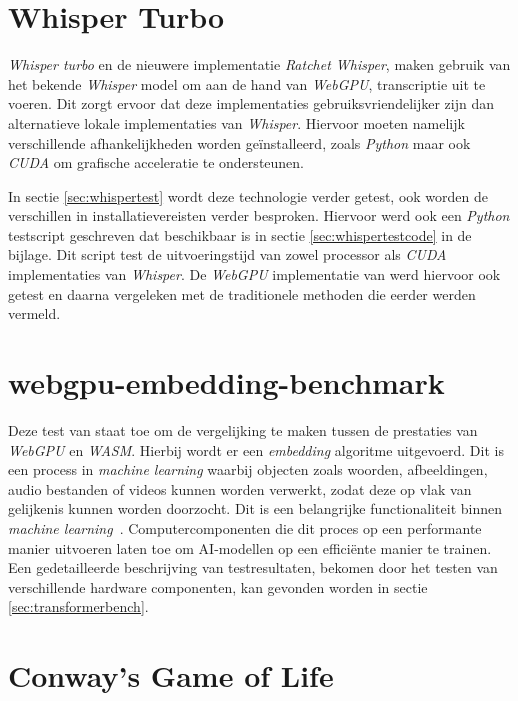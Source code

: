 \section{Whisper Turbo}

\textit{Whisper turbo} en de nieuwere implementatie \textit{Ratchet Whisper}, maken gebruik van het bekende \textit{Whisper} model om aan de hand van \textit{WebGPU}, transcriptie uit te voeren. Dit zorgt ervoor dat deze implementaties  gebruiksvriendelijker zijn dan alternatieve lokale implementaties van \textit{Whisper}. Hiervoor moeten namelijk verschillende afhankelijkheden worden geïnstalleerd, zoals \textit{Python} maar ook \textit{CUDA} om grafische acceleratie te ondersteunen. 

\bigbreak{}

In sectie \ref{sec:whispertest} wordt deze technologie verder getest, ook worden de verschillen in installatievereisten verder besproken. Hiervoor werd ook een \textit{Python} testscript geschreven dat beschikbaar is in sectie \ref{sec:whispertestcode} in de bijlage. Dit script test de uitvoeringstijd van zowel processor als \textit{CUDA} implementaties van \textit{Whisper}. De \textit{WebGPU} implementatie van \textcite{Fleetwood2024} werd hiervoor ook getest en daarna vergeleken met de traditionele methoden die eerder werden vermeld.

\section{webgpu-embedding-benchmark}

Deze test van \textcite{Lochner2024} staat toe om de vergelijking te maken tussen de prestaties van \textit{WebGPU} en \textit{WASM}. Hierbij wordt er een \textit{embedding} algoritme uitgevoerd. Dit is een process in \textit{machine learning} waarbij objecten zoals woorden, afbeeldingen, audio bestanden of videos kunnen worden verwerkt, zodat deze op vlak van gelijkenis kunnen worden doorzocht. Dit is een belangrijke functionaliteit binnen \textit{machine learning}~\autocite{Cloudflare2024}. Computercomponenten die dit proces op een performante manier uitvoeren laten toe om AI-modellen op een efficiënte manier te trainen. Een gedetailleerde beschrijving van testresultaten, bekomen door het testen van verschillende hardware componenten, kan gevonden worden in sectie \ref{sec:transformerbench}.

\section{Conway's Game of Life}

